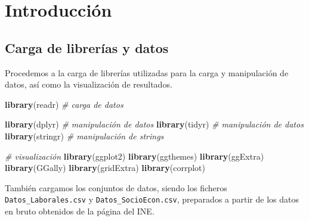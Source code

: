 \documentclass[notspecified,article,submit,moreauthors,pdftex]{Definitions/mdpi}
\newenvironment{Shaded}{\begin{snugshade}}{\end{snugshade}}
\newcommand{\CommentTok}[1]{\textcolor[rgb]{0.56,0.35,0.01}{\textit{#1}}}
\newcommand{\FunctionTok}[1]{\textcolor[rgb]{0.13,0.29,0.53}{\textbf{#1}}}
\newcommand{\NormalTok}[1]{#1}
\newcommand{\StringTok}[1]{\textcolor[rgb]{0.31,0.60,0.02}{#1}}
\begin{document}

\section{Introducción}\label{introducciuxf3n}

\subsection{Carga de librerías y
datos}\label{carga-de-libreruxedas-y-datos}

Procedemos a la carga de librerías utilizadas para la carga y
manipulación de datos, así como la visualización de resultados.

\begin{Shaded}
\begin{Highlighting}[]
\FunctionTok{library}\NormalTok{(}\StringTok{\textquotesingle{}readr\textquotesingle{}}\NormalTok{) }\CommentTok{\# carga de datos}

\FunctionTok{library}\NormalTok{(}\StringTok{\textquotesingle{}dplyr\textquotesingle{}}\NormalTok{) }\CommentTok{\# manipulación de datos}
\FunctionTok{library}\NormalTok{(}\StringTok{\textquotesingle{}tidyr\textquotesingle{}}\NormalTok{) }\CommentTok{\# manipulación de datos}
\FunctionTok{library}\NormalTok{(}\StringTok{\textquotesingle{}stringr\textquotesingle{}}\NormalTok{) }\CommentTok{\# manipulación de strings}

\CommentTok{\# visualización}
\FunctionTok{library}\NormalTok{(}\StringTok{\textquotesingle{}ggplot2\textquotesingle{}}\NormalTok{) }
\FunctionTok{library}\NormalTok{(}\StringTok{\textquotesingle{}ggthemes\textquotesingle{}}\NormalTok{) }
\FunctionTok{library}\NormalTok{(}\StringTok{\textquotesingle{}ggExtra\textquotesingle{}}\NormalTok{) }
\FunctionTok{library}\NormalTok{(}\StringTok{\textquotesingle{}GGally\textquotesingle{}}\NormalTok{) }
\FunctionTok{library}\NormalTok{(}\StringTok{\textquotesingle{}gridExtra\textquotesingle{}}\NormalTok{) }
\FunctionTok{library}\NormalTok{(}\StringTok{\textquotesingle{}corrplot\textquotesingle{}}\NormalTok{) }
\end{Highlighting}
\end{Shaded}

También cargamos los conjuntos de datos, siendo los ficheros
\texttt{Datos\_Laborales.csv} y \texttt{Datos\_SocioEcon.csv},
preparados a partir de los datos en bruto obtenidos de la página del
INE.
\end{document}
